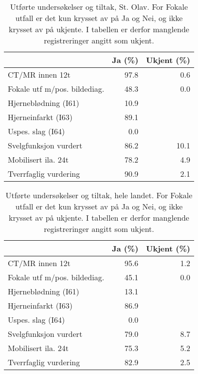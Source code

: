 \documentclass [norsk,a4paper,twoside]{article}\usepackage[]{graphicx}\usepackage[]{color}
\begin{document}
\begin{table}[ht]
\centering
\begin{tabular}{lrr}
  \hline
 & Ja (\%) & Ukjent (\%) \\ 
  \hline
CT/MR innen 12t & 97.8 & 0.6 \\ 
  Fokale utf m/pos. bildediag. & 48.3 & 0.0 \\ 
  Hjerneblødning (I61) & 10.9 &  \\ 
  Hjerneinfarkt (I63) & 89.1 &  \\ 
  Uspes. slag (I64) & 0.0 &  \\ 
  Svelgfunksjon vurdert & 86.2 & 10.1 \\ 
  Mobilisert ila. 24t & 78.2 & 4.9 \\ 
  Tverrfaglig vurdering & 90.9 & 2.1 \\ 
   \hline
\end{tabular}
\caption{Utførte undersøkelser og tiltak, St. Olav. 
		For Fokale utfall er det kun krysset av på Ja og Nei, og ikke krysset av på ukjente. 
		I tabellen er derfor manglende registreringer angitt som ukjent.} 
\label{tab:KritSupp1}
\end{table}
\begin{table}[ht]
\centering
\begin{tabular}{lrr}
  \hline
 & Ja (\%) & Ukjent (\%) \\ 
  \hline
CT/MR innen 12t & 95.6 & 1.2 \\ 
  Fokale utf m/pos. bildediag. & 45.1 & 0.0 \\ 
  Hjerneblødning (I61) & 13.1 &  \\ 
  Hjerneinfarkt (I63) & 86.9 &  \\ 
  Uspes. slag (I64) & 0.0 &  \\ 
  Svelgfunksjon vurdert & 79.0 & 8.7 \\ 
  Mobilisert ila. 24t & 75.3 & 5.2 \\ 
  Tverrfaglig vurdering & 82.9 & 2.5 \\ 
   \hline
\end{tabular}
\caption{Utførte undersøkelser og tiltak, hele landet. 
		For Fokale utfall er det kun krysset av på Ja og Nei, og ikke krysset av på ukjente. 
		I tabellen er derfor manglende registreringer angitt som ukjent.} 
\label{tab:KritSupp2}
\end{table}
\end{document}
